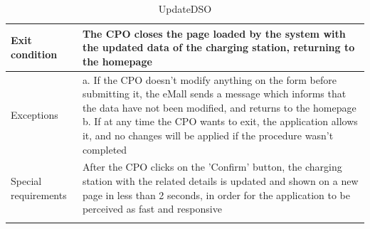 \begin{center}
\begin{longtable}{p{4cm} p{11cm}}
     \hline
     Exit condition &  The CPO closes the page loaded by the system with the updated data of the charging station, returning to the homepage \\
     \hline
     Exceptions &   a. If the CPO doesn't modify anything on the form before submitting it, the eMall sends a                       message which informs that the data have not been modified, and returns to the homepage \newline
                    b. If at any time the CPO wants to exit, the application allows it, and no changes will be applied if the procedure wasn't completed \\
     \hline
     Special requirements & After the CPO clicks on the 'Confirm' button, the charging station with the related details is updated and shown on a new page in less than 2 seconds, in order for the application to be perceived as fast and responsive \\
     \hline
    \caption{UpdateDSO}
    \label{tab:UpdateDSO}
    \end{longtable}
\end{center}

